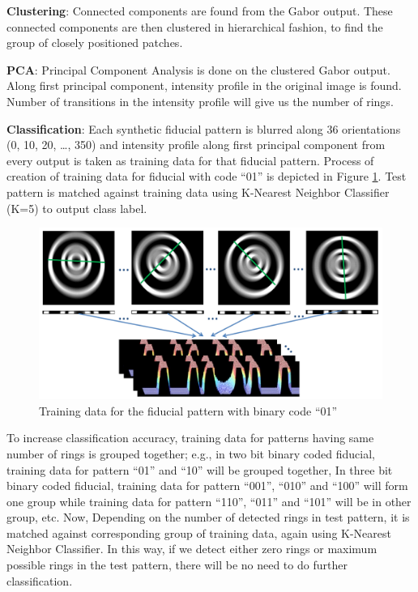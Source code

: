 \documentclass[runningheads]{llncs}
\begin{document}
\noindent\textbf{Clustering}: Connected components are found from the Gabor
output.
These connected components are then clustered in hierarchical fashion, to find
the group of closely positioned patches.

\noindent\textbf{PCA}: Principal Component Analysis is done on the clustered
Gabor output. Along first principal component, intensity profile in the original image
is found. Number of transitions in the intensity profile will give us the
number of rings.

\noindent\textbf{Classification}: Each synthetic fiducial pattern is blurred
along 36 orientations (0, 10, 20, \ldots , 350) and intensity profile along first
principal component from every output is taken as training data for that
fiducial pattern. Process of creation of training data for fiducial with
code ``01'' is depicted in Figure \ref{fig:training_data}. Test pattern is matched
against training data using K-Nearest Neighbor Classifier (K=5) to output class label.

\begin{figure}[h!]
\centering
  \includegraphics[width=\linewidth]{training_data.pdf}
  \caption{Training data for the fiducial pattern with binary code ``01''}
  \label{fig:training_data}
\end{figure}

To increase classification accuracy, training data for patterns having same
number of rings is grouped together; e.g., in two bit binary coded fiducial,
training data for pattern ``01'' and ``10'' will be grouped together, In three
bit binary coded fiducial, training data for pattern “001”, “010” and “100” will
form one group while training data for pattern “110”, “011” and “101” will be
in other group, etc. Now, Depending on the number of detected rings in test
pattern, it is matched against corresponding group of training data, again
using  K-Nearest Neighbor Classifier. In this way, if we detect either zero
rings or maximum possible rings in the test pattern, there will be no need to do
further classification.
\end{document}
